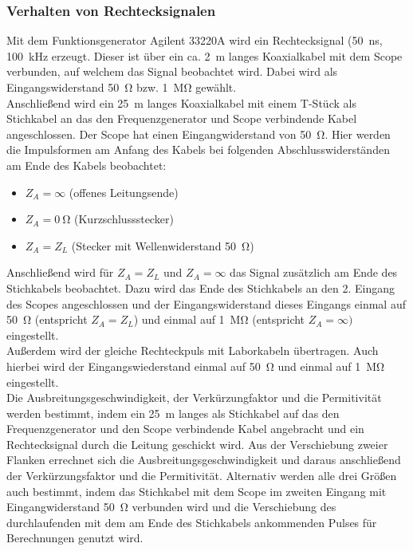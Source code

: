 \documentclass[a4paper,twoside,final]{article}
\begin{document}
\subsubsection{Verhalten von Rechtecksignalen}
Mit dem Funktionsgenerator Agilent 33220A wird ein Rechtecksignal (\SI{50}{\nano\second}, \SI{100}{\kilo\hertz} erzeugt. Dieser ist über ein ca. \SI{2}{\metre} langes Koaxialkabel mit dem Scope verbunden, auf welchem das Signal beobachtet wird. Dabei wird als Eingangswiderstand \SI{50}{\ohm} bzw. \SI{1}{\mega\ohm} gewählt.\\
Anschließend wird ein \SI{25}{\metre} langes Koaxialkabel mit einem T-Stück als Stichkabel an das den Frequenzgenerator und Scope verbindende Kabel angeschlossen. Der Scope hat einen Eingangwiderstand von \SI{50}{\ohm}. Hier werden die Impulsformen am Anfang des Kabels bei folgenden Abschlusswiderständen am Ende des Kabels beobachtet:
\begin{itemize}
  \item $Z_A = \infty$ (offenes Leitungsende)
  \item $Z_A = \SI{0}{\ohm}$ (Kurzschlussstecker)
  \item $Z_A = Z_L$ (Stecker mit Wellenwiderstand \SI{50}{\ohm})

\end{itemize}

Anschließend wird für $Z_A=Z_L$ und $Z_A = \infty$ das Signal zusätzlich am Ende des Stichkabels beobachtet. Dazu wird das Ende des Stichkabels an den 2. Eingang des Scopes angeschlossen und der Eingangswiderstand dieses Eingangs einmal auf \SI{50}{\ohm} (entspricht $Z_A = Z_L$) und einmal auf \SI{1}{\mega\ohm} (entspricht $Z_A = \infty)$ eingestellt. \\

Außerdem wird der gleiche Rechteckpuls mit Laborkabeln übertragen. Auch hierbei wird der Eingangswiederstand einmal auf \SI{50}{\ohm} und einmal auf \SI{1}{\mega\ohm} eingestellt. \\

Die Ausbreitungsgeschwindigkeit, der Verkürzungfaktor und die Permitivität werden bestimmt, indem ein \SI{25}{\metre} langes als Stichkabel auf das den Frequenzgenerator und den Scope verbindende Kabel angebracht und ein Rechtecksignal durch die Leitung geschickt wird. Aus der Verschiebung zweier Flanken errechnet sich die Ausbreitungsgeschwindigkeit und daraus anschließend der Verkürzungsfaktor und die Permitivität. Alternativ werden alle drei Größen auch bestimmt, indem das Stichkabel mit dem Scope im zweiten Eingang mit Eingangwiderstand \SI{50}{\ohm} verbunden wird und die Verschiebung des durchlaufenden mit dem am Ende des Stichkabels ankommenden Pulses für Berechnungen genutzt wird.
\end{document}
